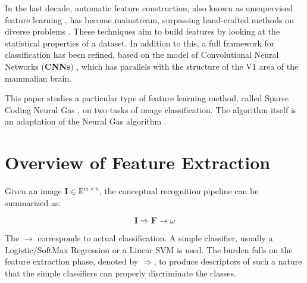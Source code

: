 \documentclass[runningheads,a4paper]{llncs}
\newcommand{\hctimes}[2]{{#1}\!\times\!{#2}}
\begin{document}
In the last decade, automatic feature construction, also known as unsupervised feature learning \cite{best-architecture-object-recognition,emergence-sparse-coding,sparse-coding-strategy-V1,tiny-images}, has become mainstream, surpassing hand-crafted methods on diverse problems \cite{best-architecture-object-recognition,learning-convolutional-feature-hierarchies,gradient-based-learning,convolutional-networks-vision,best-practices-cnn,simple-method-sparse-coding,sparse-features-audio-classification}. These techniques aim to build features by looking at the statistical properties of a dataset. In addition to this, a full framework for classification has been refined, based on the model of Convolutional Neural Networks (\textbf{CNNs}) \cite{gradient-based-learning}, which has parallels with the structure of the V1 area of the mammalian brain.

This paper studies a particular type of feature learning method, called Sparse Coding Neural Gas \cite{sparse-coding-neural-gas-1,sparse-coding-neural-gas-2,sparse-coding-neural-gas-3,sparse-coding-neural-gas-4}, on two tasks of image classification. The algorithm itself is an adaptation of the Neural Gas algorithm \cite{neural-gas-1,neural-gas-2}.

\section{Overview of Feature Extraction}

Given an image $\textbf{I} \in \mathbb{R}^{\hctimes{m}{n}}$, the conceptual recognition pipeline can be summarized as:

\begin{equation}
\textbf{I} \Rightarrow \textbf{F} \rightarrow \omega
\end{equation}

The $\rightarrow$ corresponds to actual classification. A simple classifier, usually a Logistic/SoftMax Regression or a Linear SVM is used. The burden falls on the feature extraction phase, denoted by $\Rightarrow$, to produce descriptors of such a nature that the simple classifiers can properly discriminate the classes.
\end{document}
